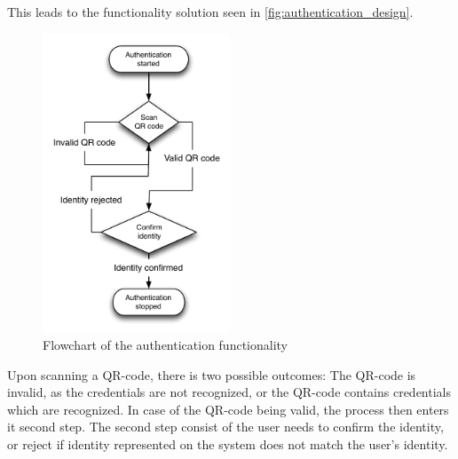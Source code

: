 This leads to the functionality solution seen in \autoref{fig:authentication_design}.
\begin{figure}[h]
	\centering
	\includegraphics[width=0.5\textwidth]{gfx/authentication_design.pdf}
	\caption{Flowchart of the authentication functionality}
	\label{fig:authentication_design}
\end{figure}

Upon scanning a QR-code, there is two possible outcomes: The QR-code is invalid, as the credentials are not recognized, or the QR-code contains credentials which are recognized.
In case of the QR-code being valid, the process then enters it second step. The second step consist of the user needs to confirm the identity, or reject if identity represented on the system does not match the user's identity.